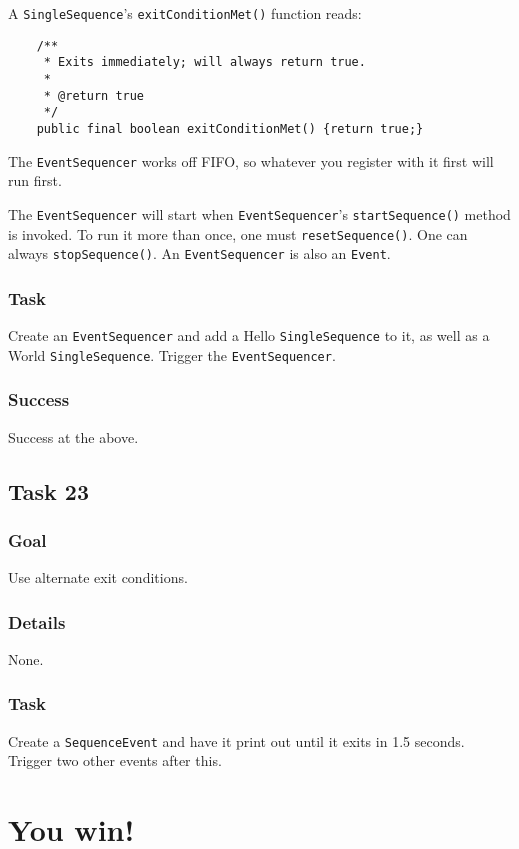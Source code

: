 \documentclass[a4paper]{article}
\begin{document}
A \lstinline{SingleSequence}'s \lstinline{exitConditionMet()} function reads:

\begin{verbatim}
	/**
	 * Exits immediately; will always return true.
	 * 
	 * @return true
	 */
	public final boolean exitConditionMet() {return true;}
\end{verbatim}

The \lstinline{EventSequencer} works off FIFO, so whatever you register with it first will run first.

The \lstinline{EventSequencer} will start when \lstinline{EventSequencer}'s \lstinline{startSequence()} method is invoked. To run it more than once, one must \lstinline{resetSequence()}. One can always \lstinline{stopSequence()}. An \lstinline{EventSequencer} is also an \lstinline{Event}.
\subsubsection{Task} Create an \lstinline{EventSequencer} and add a Hello \lstinline{SingleSequence} to it, as well as a World \lstinline{SingleSequence}. Trigger the \lstinline{EventSequencer}.
\subsubsection{Success} Success at the above.

\subsection{Task 23}
\subsubsection{Goal} Use alternate exit conditions.
\subsubsection{Details} None.
\subsubsection{Task} Create a \lstinline{SequenceEvent} and have it print out until it exits in 1.5 seconds. Trigger two other events after this.

\section*{You win!}
\end{document}
